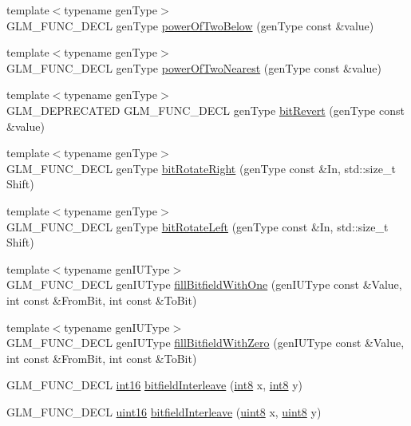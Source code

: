 \begin{CompactItemize}
\item 
{\footnotesize template$<$typename genType$>$ }\\GLM\_\-FUNC\_\-DECL genType \hyperlink{group__gtx__bit_ga0bb1687b43f594a471c5506cc505dce}{powerOfTwoBelow} (genType const \&value)
\item 
{\footnotesize template$<$typename genType$>$ }\\GLM\_\-FUNC\_\-DECL genType \hyperlink{group__gtx__bit_g0e3c8f921e59dc07ad9c70bb1376799c}{powerOfTwoNearest} (genType const \&value)
\item 
{\footnotesize template$<$typename genType$>$ }\\GLM\_\-DEPRECATED GLM\_\-FUNC\_\-DECL genType \hyperlink{group__gtx__bit_g878bcf889f80259fcf86d0e25db92af4}{bitRevert} (genType const \&value)
\item 
{\footnotesize template$<$typename genType$>$ }\\GLM\_\-FUNC\_\-DECL genType \hyperlink{group__gtx__bit_g01a6893d9fa57a4df1f6f7b0d399268d}{bitRotateRight} (genType const \&In, std::size\_\-t Shift)
\item 
{\footnotesize template$<$typename genType$>$ }\\GLM\_\-FUNC\_\-DECL genType \hyperlink{group__gtx__bit_g4cd980832ab9c35c73f8c76b8f309c92}{bitRotateLeft} (genType const \&In, std::size\_\-t Shift)
\item 
{\footnotesize template$<$typename genIUType$>$ }\\GLM\_\-FUNC\_\-DECL genIUType \hyperlink{group__gtx__bit_g98140d04738cfe05d70f090a7f1151f9}{fillBitfieldWithOne} (genIUType const \&Value, int const \&FromBit, int const \&ToBit)
\item 
{\footnotesize template$<$typename genIUType$>$ }\\GLM\_\-FUNC\_\-DECL genIUType \hyperlink{group__gtx__bit_gd7bf903dae07525ab89be5a3cad616a7}{fillBitfieldWithZero} (genIUType const \&Value, int const \&FromBit, int const \&ToBit)
\item 
GLM\_\-FUNC\_\-DECL \hyperlink{group__gtc__type__precision_g2945a61d12771f8954994fcddf02b021}{int16} \hyperlink{group__gtx__bit_g479134317bc95d99f2b2e235d3db287b}{bitfieldInterleave} (\hyperlink{group__gtc__type__precision_g96254f9c1c4506fc8eb5cf3301ce8565}{int8} x, \hyperlink{group__gtc__type__precision_g96254f9c1c4506fc8eb5cf3301ce8565}{int8} y)
\item 
GLM\_\-FUNC\_\-DECL \hyperlink{group__gtc__type__precision_gd8c2939e1fdd8e5828b31d95c52255d5}{uint16} \hyperlink{group__gtx__bit_g0700a3ceb088a0ecc23d76c154096061}{bitfieldInterleave} (\hyperlink{group__gtc__type__precision_g1a7dcd8aac97cc8020817c94049deff2}{uint8} x, \hyperlink{group__gtc__type__precision_g1a7dcd8aac97cc8020817c94049deff2}{uint8} y)

\end{CompactItemize}
